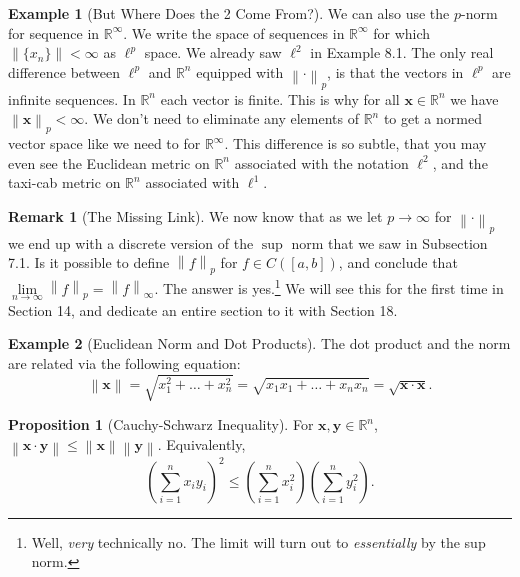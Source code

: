 \documentclass{article}
\newcommand{\R}{\mathbb{R}}
\newcommand{\x}{\mathbf{x}}
\newcommand{\y}{\mathbf{y}}
\newcommand{\norm}[1]{\left\lVert#1\right\rVert}
\theoremstyle{definition}
\newtheorem{proposition}{Proposition}[section]
\newtheorem{example}{Example}[section]
\newtheorem{remark}{Remark}[section]
\begin{document}
\begin{example}[But Where Does the 2 Come From?]
		
		We can also use the $ p $-norm for sequence in $ \R^\infty $. We write the space of sequences in $ \R^\infty $ for which $ \norm{\{x_n\}}<\infty $ as $ \ell^p $ space. We already saw $ \ell^2 $ in Example 8.1. The only real difference between $ \ell^p $ and $ \R^n $ equipped with $ \norm{\cdot}_p $, is that the vectors in $ \ell^p $ are infinite sequences. In $ \R^n $ each vector is finite. This is why for all $ \x\in\R^n $ we have $ \norm{\x}_p<\infty $. We don't need to eliminate any elements of $ \R^n $ to get a normed vector space like we need to for $ \R^\infty $. This difference is so subtle, that you may even see the Euclidean metric on $ \R^n $ associated with the notation $ \ell^2 $, and the taxi-cab metric on $ \R^n $ associated with $ \ell^1 $.  
	\end{example}
	\begin{remark}[The Missing Link]
		We now know that as we let $ p\to\infty $ for $ \norm{\cdot}_p $ we end up with a discrete version of the $ \sup $ norm that we saw in Subsection 7.1. Is it possible to define $ \norm{f}_p $ for $ f\in C([a,b]) $, and conclude that $ \lim\limits_{n\to\infty}\norm{f}_p=\norm{f}_\infty $. The answer is yes.\footnote{Well, \textit{very} technically no. The limit will turn out to \textit{essentially} by the sup norm.} We will see this for the first time in Section 14, and dedicate an entire section to it with Section 18.
	\end{remark}
	\begin{example}[Euclidean Norm and Dot Products]
		The dot product and the norm are related via the following equation:
		$$ \norm{\x}=\sqrt{x_1^2+\ldots+x_n^2}=\sqrt{x_1x_1+\ldots+x_nx_n}=\sqrt{\x\cdot\x}.$$
	\end{example}
	\begin{proposition}[Cauchy-Schwarz Inequality]
		For $ \x,\y\in\R^n $, $\norm{\x\cdot\y}\le \norm{\x}\norm{\y} $. Equivalently, 
		$$ \left(\sum_{i=1}^{n}x_iy_i\right)^2\le \left(\sum_{i=1}^n x_i^2\right)\left(\sum_{i=1}^n y_i^2\right).$$
	\end{proposition}
\end{document}
